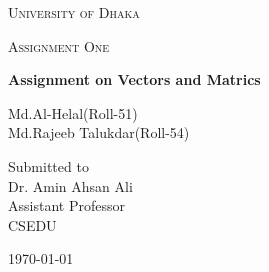 \documentclass[12pt,a4paper]{report}
\begin{document}
\begin{titlepage}
\centering
{\scshape\LARGE University of Dhaka \par}
\vspace{1cm}
{\scshape\Large Assignment One\par}
\vspace{1.5cm}
{\huge\bfseries Assignment on Vectors and Matrics\par}
\vspace{2cm}
{\Large Md.Al-Helal(Roll-51)\\Md.Rajeeb Talukdar(Roll-54)\par}
\vfill
Submitted to\\
\vspace{0.5cm}
{\Large Dr. Amin Ahsan Ali} \\ Assistant Professor\\CSEDU
\vfill
{\large \today\par}
\end{titlepage}
\end{document}
